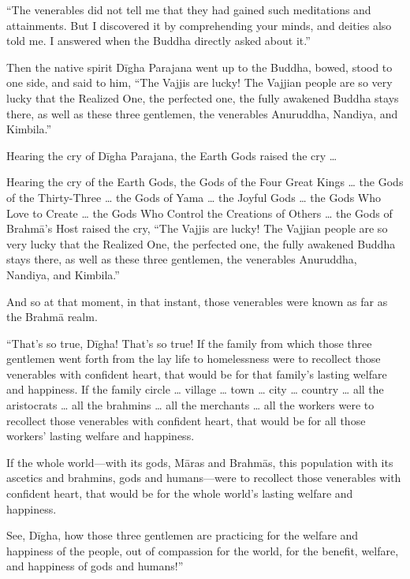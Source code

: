\documentclass[12pt,openany]{book}%
\begin{document}
“The venerables did not tell me that they had gained such meditations and attainments. But I discovered it by comprehending your minds, and deities also told me. I answered when the Buddha directly asked about it.” 

Then the native spirit \textsanskrit{Dīgha} Parajana went up to the Buddha, bowed, stood to one side, and said to him, “The Vajjis are lucky! The Vajjian people are so very lucky that the Realized One, the perfected one, the fully awakened Buddha stays there, as well as these three gentlemen, the venerables Anuruddha, Nandiya, and Kimbila.” 

Hearing the cry of \textsanskrit{Dīgha} Parajana, the Earth Gods raised the cry … 

Hearing the cry of the Earth Gods, the Gods of the Four Great Kings … the Gods of the Thirty-Three … the Gods of Yama … the Joyful Gods … the Gods Who Love to Create … the Gods Who Control the Creations of Others … the Gods of \textsanskrit{Brahmā}’s Host raised the cry, “The Vajjis are lucky! The Vajjian people are so very lucky that the Realized One, the perfected one, the fully awakened Buddha stays there, as well as these three gentlemen, the venerables Anuruddha, Nandiya, and Kimbila.” 

And so at that moment, in that instant, those venerables were known as far as the \textsanskrit{Brahmā} realm. 

“That’s so true, \textsanskrit{Dīgha}! That’s so true! If the family from which those three gentlemen went forth from the lay life to homelessness were to recollect those venerables with confident heart, that would be for that family’s lasting welfare and happiness. If the family circle … village … town … city … country … all the aristocrats … all the brahmins … all the merchants … all the workers were to recollect those venerables with confident heart, that would be for all those workers’ lasting welfare and happiness. 

If the whole world—with its gods, \textsanskrit{Māras} and \textsanskrit{Brahmās}, this population with its ascetics and brahmins, gods and humans—were to recollect those venerables with confident heart, that would be for the whole world’s lasting welfare and happiness. 

See, \textsanskrit{Dīgha}, how those three gentlemen are practicing for the welfare and happiness of the people, out of compassion for the world, for the benefit, welfare, and happiness of gods and humans!” 
\end{document}
